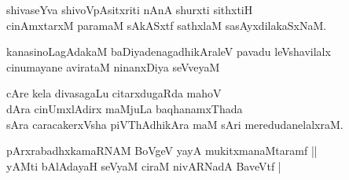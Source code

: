 \begin{entry}
\begin{shl}
shivaseYva shivoVpAsitxriti nAnA shurxti sithxtiH\\
cinAmxtarxM paramaM sAkASxtf sathxlaM sasAyxdilakaSxNaM.
\end{shl}
\end{entry}

\begin{entry}
\begin{shl}
kanasinoLagAdakaM baDiyadenagadhikAraleV pavadu leVshavilalx\\
cinumayane avirataM ninanxDiya seVveyaM
\end{shl}
\end{entry}

\begin{entry}
\begin{shl}
cAre kela divasagaLu citarxdugaRda mahoV\\
dAra cinUmxlAdirx maMjuLa baqhanamxThada\\
sAra caracakerxVsha piVThAdhikAra maM sAri meredudanelalxraM.
\end{shl}
\end{entry}

\begin{entry}
\begin{shl}
pArxrabadhxkamaRNAM BoVgeV yayA mukitxmanaMtaramf ||\\
yAMti bAlAdayaH seVyaM ciraM nivARNadA BaveVtf |
\end{shl}
\end{entry}

\begin{entry}
\end{entry}

